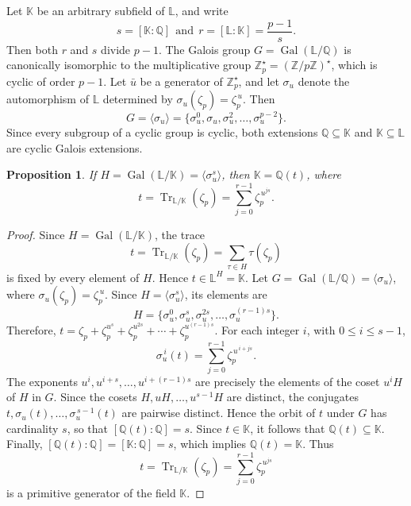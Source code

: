 \documentclass[10pt,a4paper]{amsart}
\newtheorem{proposition}[theorem]{Proposition}
\begin{document}
Let $\mathbb{K}$ be an arbitrary subfield of $\mathbb{L}$, and write \[ s=[\mathbb{K}:\mathbb{Q}] \ \ \mbox{and} \ \ r=[\mathbb{L}:\mathbb{K}]=\frac{p-1}{s}. \] Then both $r$ and $s$ divide $p-1$. The Galois group
$G=\operatorname{Gal}(\mathbb{L}/\mathbb{Q})$ is canonically isomorphic to the multiplicative group $\mathbb{Z}_p^{\star} =(\mathbb{Z}/p\mathbb{Z})^{\star}$,
which is cyclic of order $p-1$. Let $\bar{u}$ be a generator of $\mathbb{Z}_p^{\star}$, and let $\sigma_u$ denote the automorphism of $\mathbb{L}$ determined by $\sigma_u(\zeta_p)=\zeta_p^{\,u}$.
Then \[ G=\langle\sigma_u\rangle = \{\sigma_u^0,\sigma_u,\sigma_u^2,\ldots,\sigma_u^{p-2}\}. \] Since every subgroup of a cyclic group is cyclic, both extensions $\mathbb{Q}\subseteq\mathbb{K}$ and $\mathbb{K}\subseteq\mathbb{L}$ are cyclic Galois extensions.

\begin{proposition} If $H=\operatorname{Gal}(\mathbb{L}/\mathbb{K}) = \langle \sigma_{u}^s\rangle$, then $\mathbb{K}=\mathbb{Q}(t)$, where
\[ t = \operatorname{Tr}_{\mathbb{L}/\mathbb{K}}(\zeta_p) = \sum_{j=0}^{r-1}\zeta_p^{\,u^{js}}. \]
\end{proposition}
\begin{proof} Since $H=\operatorname{Gal}(\mathbb{L}/\mathbb{K})$, the trace \[ t = \operatorname{Tr}_{\mathbb{L}/\mathbb{K}}(\zeta_p) = \sum_{\tau\in H}\tau(\zeta_p) \]
is fixed by every element of $H$. Hence $t\in\mathbb{L}^H=\mathbb{K}$. Let $ G=\operatorname{Gal}(\mathbb{L}/\mathbb{Q}) = \langle\sigma_u\rangle$, where $\sigma_u(\zeta_p)=\zeta_p^{\,u}$. Since
$H=\langle\sigma_{u}^s\rangle$,  its elements are \[ H = \{\sigma_u^0,\sigma_{u}^s,\sigma_{u}^{2s},\ldots,\sigma_{u}^{(r-1)s}\}. \] Therefore, $t = \zeta_p+\zeta_p^{u^s}
+\zeta_p^{u^{2s}} +\cdots+\zeta_p^{u^{(r-1)s}}$. For each integer $i$, with $0\le i\le s-1$, \[ \sigma_u^{\,i}(t) = \sum_{j=0}^{r-1} \zeta_p^{\,u^{\,i+js}}. \]
The exponents $u^{i},u^{i+s},\ldots,u^{i+(r-1)s}$ are precisely the elements of the coset $u^{i}H$ of $H$ in $G$. Since the cosets $H,uH,\ldots,u^{s-1}H$ are distinct, the conjugates
$t,\sigma_u(t),\ldots,\sigma_u^{\,s-1}(t)$ are pairwise distinct. Hence the orbit of $t$ under $G$ has cardinality $s$, so that
$[\mathbb{Q}(t):\mathbb{Q}] =s$. Since $t\in\mathbb{K}$, it follows that $\mathbb{Q}(t)\subseteq\mathbb{K}$. Finally, $
[\mathbb{Q}(t):\mathbb{Q}] = [\mathbb{K}:\mathbb{Q}] = s$, which implies $\mathbb{Q}(t)=\mathbb{K}$. Thus 
\[ t = \operatorname{Tr}_{\mathbb{L}/\mathbb{K}}(\zeta_p) = \sum_{j=0}^{r-1}\zeta_p^{\,u^{js}} \] is a primitive generator of the field $\mathbb{K}$.
\end{proof}
\end{document}
